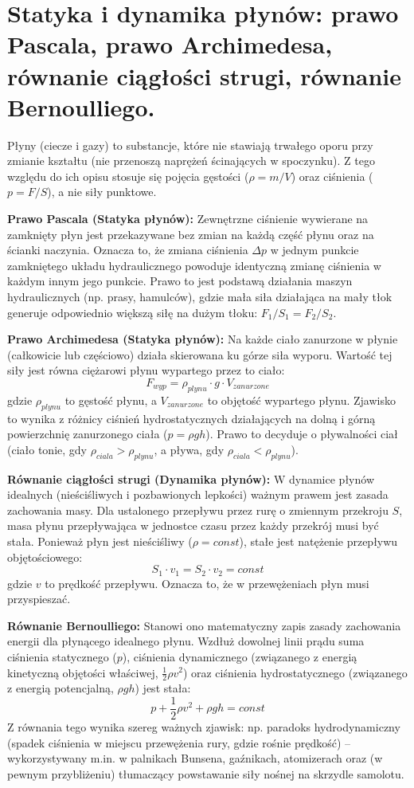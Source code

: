 \documentclass[11pt, a4paper]{article}
\begin{document}
\section{Statyka i dynamika płynów: prawo Pascala, prawo Archimedesa, równanie ciągłości strugi, równanie Bernoulliego.}

Płyny (ciecze i gazy) to substancje, które nie stawiają trwałego oporu przy zmianie kształtu (nie przenoszą naprężeń ścinających w spoczynku). Z tego względu do ich opisu stosuje się pojęcia gęstości ($\rho = m/V$) oraz ciśnienia ($p = F/S$), a nie siły punktowe.

\textbf{Prawo Pascala (Statyka płynów):}
Zewnętrzne ciśnienie wywierane na zamknięty płyn jest przekazywane bez zmian na każdą część płynu oraz na ścianki naczynia. Oznacza to, że zmiana ciśnienia $\Delta p$ w jednym punkcie zamkniętego układu hydraulicznego powoduje identyczną zmianę ciśnienia w każdym innym jego punkcie. Prawo to jest podstawą działania maszyn hydraulicznych (np. prasy, hamulców), gdzie mała siła działająca na mały tłok generuje odpowiednio większą siłę na dużym tłoku: $F_1/S_1 = F_2/S_2$.

\textbf{Prawo Archimedesa (Statyka płynów):}
Na każde ciało zanurzone w płynie (całkowicie lub częściowo) działa skierowana ku górze siła wyporu. Wartość tej siły jest równa ciężarowi płynu wypartego przez to ciało:
\[
F_{wyp} = \rho_{plynu} \cdot g \cdot V_{zanurzone}
\]
gdzie $\rho_{plynu}$ to gęstość płynu, a $V_{zanurzone}$ to objętość wypartego płynu. Zjawisko to wynika z różnicy ciśnień hydrostatycznych działających na dolną i górną powierzchnię zanurzonego ciała ($p = \rho g h$). Prawo to decyduje o pływalności ciał (ciało tonie, gdy $\rho_{ciala} > \rho_{plynu}$, a pływa, gdy $\rho_{ciala} < \rho_{plynu}$).

\textbf{Równanie ciągłości strugi (Dynamika płynów):}
W dynamice płynów idealnych (nieściśliwych i pozbawionych lepkości) ważnym prawem jest zasada zachowania masy. Dla ustalonego przepływu przez rurę o zmiennym przekroju $S$, masa płynu przepływająca w jednostce czasu przez każdy przekrój musi być stała. Ponieważ płyn jest nieściśliwy ($\rho = const$), stałe jest natężenie przepływu objętościowego:
\[
S_1 \cdot v_1 = S_2 \cdot v_2 = const
\]
gdzie $v$ to prędkość przepływu. Oznacza to, że w przewężeniach płyn musi przyspieszać.

\textbf{Równanie Bernoulliego:}
Stanowi ono matematyczny zapis zasady zachowania energii dla płynącego idealnego płynu. Wzdłuż dowolnej linii prądu suma ciśnienia statycznego ($p$), ciśnienia dynamicznego (związanego z energią kinetyczną objętości właściwej, $\frac{1}{2}\rho v^2$) oraz ciśnienia hydrostatycznego (związanego z energią potencjalną, $\rho g h$) jest stała:
\[
p + \frac{1}{2}\rho v^2 + \rho g h = const
\]
Z równania tego wynika szereg ważnych zjawisk: np. paradoks hydrodynamiczny (spadek ciśnienia w miejscu przewężenia rury, gdzie rośnie prędkość) – wykorzystywany m.in. w palnikach Bunsena, gaźnikach, atomizerach oraz (w pewnym przybliżeniu) tłumaczący powstawanie siły nośnej na skrzydle samolotu.
\end{document}
